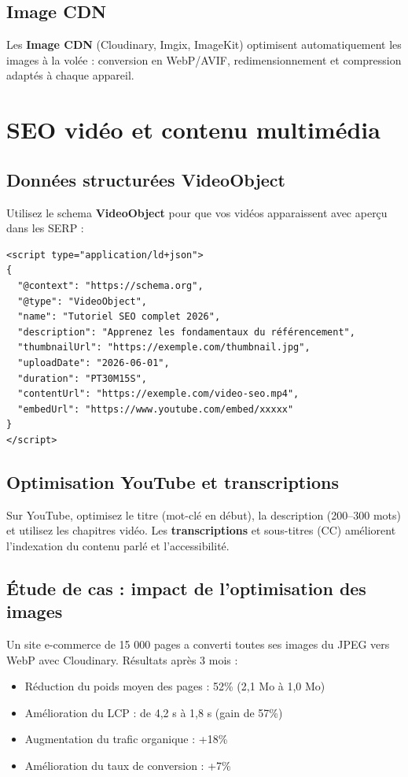 \documentclass[12pt,a4paper,twoside]{report}
\newcommand{\keyword}[1]{\textbf{\textcolor{googleblue}{#1}}}
\begin{document}
\subsection{Image CDN}

Les \keyword{Image CDN} (Cloudinary, Imgix, ImageKit) optimisent automatiquement les images à la volée : conversion en WebP/AVIF, redimensionnement et compression adaptés à chaque appareil.

\section{SEO vidéo et contenu multimédia}

\subsection{Données structurées VideoObject}

Utilisez le schema \keyword{VideoObject} pour que vos vidéos apparaissent avec aperçu dans les SERP :

\begin{lstlisting}[style=htmlcode,caption={Schema VideoObject en JSON-LD}]
<script type="application/ld+json">
{
  "@context": "https://schema.org",
  "@type": "VideoObject",
  "name": "Tutoriel SEO complet 2026",
  "description": "Apprenez les fondamentaux du référencement",
  "thumbnailUrl": "https://exemple.com/thumbnail.jpg",
  "uploadDate": "2026-06-01",
  "duration": "PT30M15S",
  "contentUrl": "https://exemple.com/video-seo.mp4",
  "embedUrl": "https://www.youtube.com/embed/xxxxx"
}
</script>
\end{lstlisting}

\subsection{Optimisation YouTube et transcriptions}

Sur YouTube, optimisez le titre (mot-clé en début), la description (200--300 mots) et utilisez les chapitres vidéo. Les \keyword{transcriptions} et sous-titres (CC) améliorent l'indexation du contenu parlé et l'accessibilité.

\subsection{Étude de cas : impact de l'optimisation des images}

Un site e-commerce de 15 000 pages a converti toutes ses images du JPEG vers WebP avec Cloudinary. Résultats après 3 mois :
\begin{itemize}
    \item Réduction du poids moyen des pages : 52\% (2,1 Mo à 1,0 Mo)
    \item Amélioration du LCP : de 4,2 s à 1,8 s (gain de 57\%)
    \item Augmentation du trafic organique : +18\%
    \item Amélioration du taux de conversion : +7\%
\end{itemize}
\end{document}

